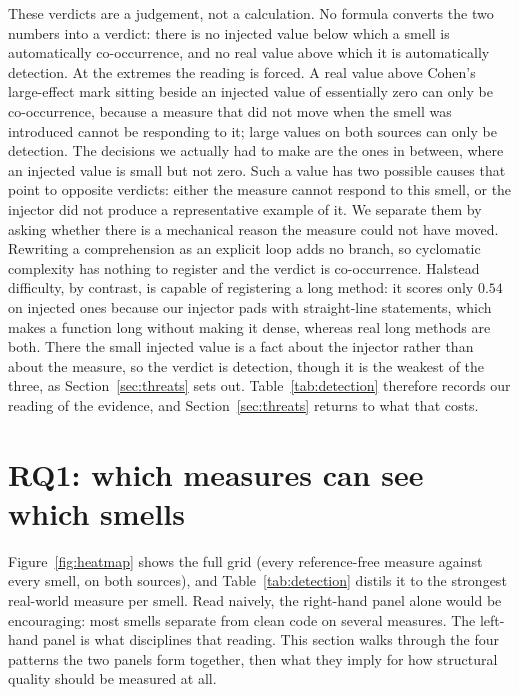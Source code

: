 \documentclass[10pt,a4paper,twocolumn]{article}
\begin{document}
These verdicts are a judgement, not a calculation. No formula converts the two
numbers into a verdict: there is no injected value below which a smell is
automatically co-occurrence, and no real value above which it is automatically
detection. At the extremes the reading is forced. A real value above Cohen's
large-effect mark sitting beside an injected value of essentially zero can only
be co-occurrence, because a measure that did not move when the smell was
introduced cannot be responding to it; large values on both sources can only be
detection. The decisions we actually had to make are the ones in between, where
an injected value is small but not zero. Such a value has two possible causes
that point to opposite verdicts: either the measure cannot respond to this
smell, or the injector did not produce a representative example of it. We
separate them by asking whether there is a mechanical reason the measure could
not have moved. Rewriting a comprehension as an explicit loop adds no branch, so
cyclomatic complexity has nothing to register and the verdict is co-occurrence.
Halstead difficulty, by contrast, is capable of registering a long method: it
scores only $0.54$ on injected ones because our injector pads with straight-line
statements, which makes a function long without making it dense, whereas real
long methods are both. There the small injected value is a fact about the
injector rather than about the measure, so the verdict is detection, though it
is the weakest of the three, as Section~\ref{sec:threats} sets out.
Table~\ref{tab:detection} therefore records our reading of the evidence, and
Section~\ref{sec:threats} returns to what that costs.

\section{RQ1: which measures can see which smells}
\label{sec:rq1}

Figure~\ref{fig:heatmap} shows the full grid (every reference-free measure
against every smell, on both sources), and Table~\ref{tab:detection} distils it
to the strongest real-world measure per smell. Read naively, the right-hand
panel alone would be encouraging: most smells separate from clean code on
several measures. The left-hand panel is what disciplines that reading. This
section walks through the four patterns the two panels form together, then what
they imply for how structural quality should be measured at all.
\end{document}
